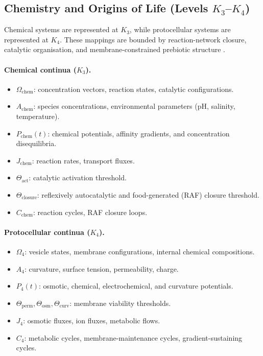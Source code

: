 \subsection{Chemistry and Origins of Life (Levels \texorpdfstring{$K_3$}{K3}--\texorpdfstring{$K_4$}{K4})}

Chemical systems are represented at \(K_3\), while protocellular systems are represented at
\(K_4\).
These mappings are bounded by reaction-network closure, catalytic organisation, and
membrane-constrained prebiotic structure \parencite{kauffman_autocatalytic,raf_networks}.

\paragraph{Chemical continua (\texorpdfstring{\(K_3\)}{K3}).}
\begin{itemize}
  \item \(\Omega_{\mathrm{chem}}\): concentration vectors, reaction states,
        catalytic configurations.
  \item \(A_{\mathrm{chem}}\): species concentrations, environmental parameters
        (pH, salinity, temperature).
  \item \(P_{\mathrm{chem}}(t)\): chemical potentials, affinity gradients, and
        concentration disequilibria.
  \item \(J_{\mathrm{chem}}\): reaction rates, transport fluxes.
  \item \(\Theta_{\mathrm{act}}\): catalytic activation threshold.
  \item \(\Theta_{\mathrm{closure}}\): reflexively autocatalytic and
        food-generated (RAF) closure threshold.
  \item \(C_{\mathrm{chem}}\): reaction cycles, RAF closure loops.
\end{itemize}

\paragraph{Protocellular continua (\texorpdfstring{\(K_4\)}{K4}).}
\begin{itemize}
  \item \(\Omega_{4}\): vesicle states, membrane configurations, internal
        chemical compositions.
  \item \(A_4\): curvature, surface tension, permeability, charge.
  \item \(P_4(t)\): osmotic, chemical, electrochemical, and curvature
        potentials.
  \item \(\Theta_{\mathrm{perm}}, \Theta_{\mathrm{osm}}, \Theta_{\mathrm{curv}}\):
        membrane viability thresholds.
  \item \(J_4\): osmotic fluxes, ion fluxes, metabolic flows.
  \item \(C_4\): metabolic cycles, membrane-maintenance cycles,
        gradient-sustaining cycles.
\end{itemize}

